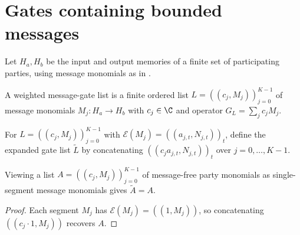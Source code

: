 \section{Gates containing bounded messages}
\label{sec:peps_message_gate_expansion}

Let $H_a,H_b$ be the input and output memories of a finite set of participating
parties, using message monomials as in
\cite[Proof of Theorem~5.2]{OpenAI2026PolynomialPEPS}.

\begin{definition}
    \label{def:peps_message_gate}
    \leanok
    A weighted message-gate list is a finite ordered list
    $L=((c_j,M_j))_{j=0}^{K-1}$ of message monomials $M_j:H_a\to H_b$ with
    $c_j\in\C$ and operator $G_L=\sum_j c_jM_j$.
\end{definition}

\begin{definition}
    \label{def:peps_message_gate_expand}
    \leanok
    For $L=((c_j,M_j))_{j=0}^{K-1}$ with $\mathcal E(M_j)=((a_{j,t},N_{j,t}))_t$,
    define the expanded gate list $\widetilde L$ by concatenating
    $((c_ja_{j,t},N_{j,t}))_t$ over $j=0,\ldots,K-1$.
\end{definition}


\begin{lemma}
    \label{thm:peps_message_gate_segment_expansion}
    \leanok
    Viewing a list $A=((c_j,M_j))_{j=0}^{K-1}$ of message-free party monomials
    as single-segment message monomials gives $\widetilde A=A$.
\end{lemma}

\begin{proof}
    \leanok
    Each segment $M_j$ has $\mathcal E(M_j)=((1,M_j))$, so concatenating
    $((c_j\cdot 1,M_j))$ recovers $A$.
\end{proof}

